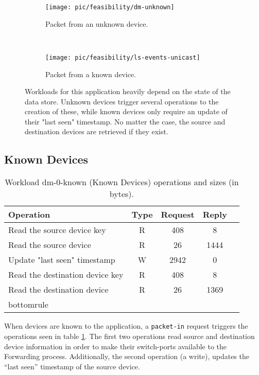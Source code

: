 \documentclass[12pt,openright,twoside]{report}
\begin{document}
\begin{figure}
  \centering
  \begin{subfigure}[b]{0.5\textwidth}
                \centering
                \texttt{[image: pic/feasibility/dm-unknown]}
                \caption{Packet from an unknown device.}
                \label{fig:dm:interaction:unknown}
        \end{subfigure}%
        ~
        \begin{subfigure}[b]{0.5\textwidth}
                \centering
                \texttt{[image: pic/feasibility/ls-events-unicast]}
                \caption{Packet from a known device.}
                \label{fig:dm:interaction:known}
        \end{subfigure}
        \caption[Device Manager workload events]{Workloads for this application heavily depend on the state of the data store. Unknown devices trigger several operations to the creation of these, while known devices only require an update of their "last seen" timestamp. No matter the case, the source and destination devices are retrieved if they exist.}
        \label{fig:dm:interaction}
\end{figure}

\subsection{Known Devices}

\begin{table}[ht]
\small
\centering 
\begin{tabular}{l c c c c}
Operation & Type & Request & Reply \\ \toprule 
Read the source device key & R & 408 & 8\\
Read the source device & R & 26 & 1444\\
Update "last seen" timestamp & W & 2942 & 0\\
Read the destination device key & R & 408 & 8\\
Read the destination device & R & 26 & 1369 \\bottomrule 
\end{tabular}
\caption[Workload dm-0-known (Known Devices) operations]{Workload
  dm-0-known (Known Devices) operations and sizes (in bytes).}
\label{table:ops:dm-0-known}
\end{table}

When devices are known to the application, a \texttt{packet-in} request
triggers the operations seen in table \ref{table:ops:dm-0-known}. The
first two operations read source and destination device
information in order to make their switch-ports available to the
Forwarding process. Additionally, the second operation (a write), 
updates the ``last seen'' timestamp of the source device.
\end{document}
